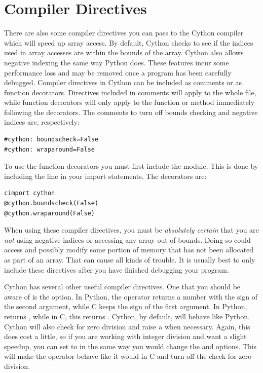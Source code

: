 \section*{Compiler Directives}
There are also some compiler directives you can pass to the Cython compiler which will speed up array access.
By default, Cython checks to see if the indices used in array accesses are within the bounds of the array.
Cython also allows negative indexing the same way Python does.
These features incur some performance loss and may be removed once a program has been carefully debugged.
Compiler directives in Cython can be included as comments or as function decorators.
Directives included in comments will apply to the whole file, while function decorators will only apply to the function or method immediately following the decorators.
The comments to turn off bounds checking and negative indices are, respectively:
\begin{lstlisting}
#cython: boundscheck=False
#cython: wraparound=False
\end{lstlisting}
To use the function decorators you must first include the  module.
This is done by including the line  in your import statements.
The decorators are:
\begin{lstlisting}
cimport cython
@cython.boundscheck(False)
@cython.wraparound(False)
\end{lstlisting}
When using these compiler directives, you must be \emph{absolutely certain} that you are \emph{not} using negative indices or accessing any array out of bounds.
Doing so could access and possibly modify some portion of memory that has not been allocated as part of an array.
That can cause all kinds of trouble.
It is usually best to only include these directives after you have finished debugging your program.

Cython has several other useful compiler directives.
One that you should be aware of is the  option.
In Python, the \li{\%} operator returns a number with the sign of the second argument, while C keeps the sign of the first argument.
In Python,  returns , while in C, this returns .
Cython, by default, will behave like Python.
Cython will also check for zero division and raise a  when necessary.
Again, this does cost a little, so if you are working with integer division and want a slight speedup, you can set  to  in the same way you would change the  and  options.
This will make the \li{\%} operator behave like it would in C and turn off the check for zero division.


